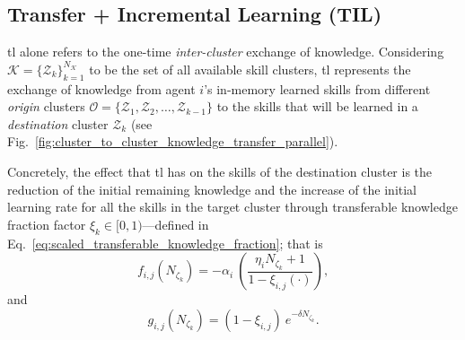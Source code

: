 \subsection{\textbf{Transfer + Incremental Learning (TIL)}}
\Acl{tl} alone refers to the one-time \emph{inter-cluster} exchange of knowledge. Considering $\mathcal{K} = \{ \mathcal{Z}_k \}^{N_\mathcal{K}}_{k=1}$ to be the set of all available skill clusters, \ac{tl} represents the exchange of knowledge from agent $i$'s in-memory learned skills from different \emph{origin} clusters $\mathcal{O} = \{ \mathcal{Z}_1,\mathcal{Z}_2,\ldots,\mathcal{Z}_{k-1} \}$ to the skills that will be learned in a \emph{destination} cluster $\mathcal{Z}_k$ (see Fig.~\ref{fig:cluster_to_cluster_knowledge_transfer_parallel}). 

Concretely, the effect that \ac{tl} has on the skills of the destination cluster is the reduction of the initial remaining knowledge and the increase of the initial learning rate for all the skills in the target cluster through transferable knowledge fraction factor $\xi_k \in [0,1)$---defined in Eq.~\ref{eq:scaled_transferable_knowledge_fraction}; that is
\begin{equation}\label{eq:f_function_transfer}
	f_{i,j}\left(N_{\zeta_k}\right) = -\alpha_i\:\left( \frac{\eta_i N_{\zeta_k} + 1}{1 - \xi_{i,j}(\cdot)} \right),
\end{equation}
and
\begin{equation}\label{eq:g_function_transfer}
	g_{i,j}\left(N_{\zeta_k}\right) = (1-\xi_{i,j})\:e^{-\delta N_{\zeta_k}}.
\end{equation}


